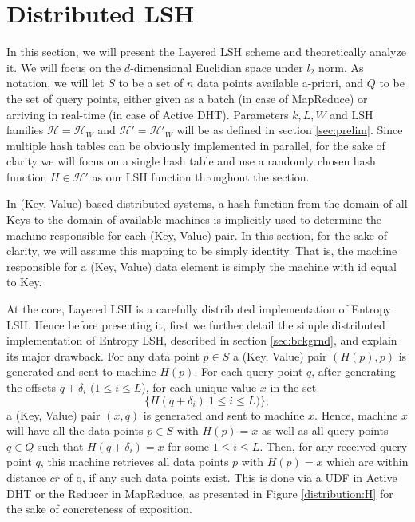 \documentclass{acm_proc_article-sp}
\numberwithin{equation}{section}
\numberwithin{figure}{section}
\begin{document}
\section{Distributed LSH}
\label{sec:distlsh}

In this section, we will present the Layered LSH scheme and theoretically analyze it. We will focus on the $d$-dimensional Euclidian space under $l_2$ norm. As notation, we will let $S$ to be a set of $n$ data points available a-priori, and $Q$ to be the set of query points, either given as a batch (in case of MapReduce) or arriving in real-time (in case of Active DHT). Parameters $k, L, W$ and LSH families $\mathcal{H}=\mathcal{H}_W$ and $\mathcal{H'}=\mathcal{H'}_W$ will be as defined in section \ref{sec:prelim}. Since multiple hash tables can be obviously implemented in parallel, for the sake of clarity we will focus on a single hash table and use a randomly chosen hash function $H\in \mathcal{H'}$ as our LSH function throughout the section. 



In (Key, Value) based distributed systems, a hash function from the domain of all Keys to the domain of available machines is implicitly used to determine the machine responsible for each (Key, Value) pair. In this section, for the sake of clarity, we will assume this mapping to be simply identity. That is, the machine responsible for a (Key, Value) data element is simply the machine with id equal to Key.

At the core, Layered LSH is a carefully distributed implementation of Entropy LSH. Hence before presenting it, first we further detail the simple distributed implementation of Entropy LSH, described in section \ref{sec:bckgrnd}, and explain its major drawback. For any data point $p\in S$ a (Key, Value) pair $(H(p),p)$ is generated and sent to machine $H(p)$. For each query point $q$, after generating the offsets $q+\delta_i$ ($1\leq i\leq L$), for each unique value $x$ in the set \[\{H(q+\delta_i)| 1\leq i \leq L)\},\] a (Key, Value) pair $(x,q)$ is generated and sent to machine $x$. Hence, machine $x$ will have all the data points $p\in S$ with $H(p)=x$ as well as all query points $q\in Q$ such that $H(q+\delta_i)=x$ for some $1\leq i\leq L$. Then, for any received query point $q$, this machine retrieves all data points $p$ with $H(p)=x$ which are within distance $cr$ of q, if any such data points exist. This is done via a UDF in Active DHT or the Reducer in MapReduce, as presented in Figure \ref{distribution:H} for the sake of concreteness of exposition.  
\end{document}
